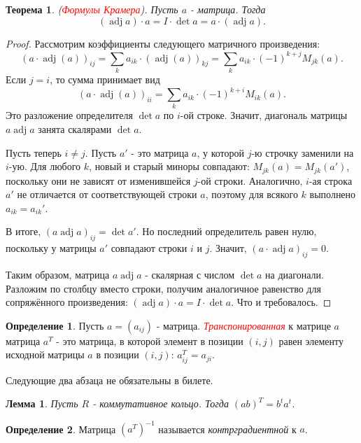 \documentclass[a4paper,100pt]{article}
\theoremstyle{indented}
\newtheorem{theorem}{Теорема}
\newtheorem{lemma}{Лемма}
\theoremstyle{definition}
\newtheorem{defn}{Определение}
\theoremstyle{remark}
\DeclareMathOperator{\adj}{adj}
\begin{document}
\begin{theorem}
    (\hypertarget{n102}{\textcolor{red}{\textit{Формулы Крамера}}}). Пусть $a$ - матрица. Тогда 
    \[
        (\adj a)\cdot a=I\cdot \det a=a\cdot (\adj a).
    \]
\end{theorem}

\begin{proof}
    Рассмотрим коэффициенты следующего матричного произведения: 
    \[
        (a\cdot \adj(a))_{ij}=\sum_k a_{ik}\cdot (\adj (a))_{kj}=\sum_k a_{ik}\cdot (-1)^{k+j}M_{jk}(a).
    \]
    Если $j=i$, то сумма принимает вид
    \[
        (a\cdot\adj(a))_{ii}=\sum_k a_{ik}\cdot(-1)^{k+i}M_{ik}(a).
    \]
    Это разложение определителя $\det a$ по $i$-ой строке. Значит, диагональ матрицы $a \adj a$ занята скалярами $\det a$.\ 

    Пусть теперь $i\neq j$. Пусть $a'$ - это матрица $a$, у которой $j$-ю строчку заменили на $i$-ую. Для любого $k$, новый и старый миноры совпадают: $M_{jk}(a)=M_{jk}(a')$, поскольку они не зависят от изменившейся $j$-ой строки. Аналогично, $i$-ая строка $a'$ не отличается от соответствующей строки $a$, поэтому для всякого $k$ выполнено $a_{ik}=a_{ik}'$.\ 

    В итоге, $(a\adj a)_{ij}=\det a'$. Но последний определитель равен нулю, поскольку у матрицы $a'$ совпадают строки $i$ и $j$. Значит, $(a\cdot \adj a)_{ij}=0$.\ 

    Таким образом, матрица $a\adj a$ - скалярная с числом $\det a$ на диагонали. Разложим по столбцу вместо строки, получим аналогичное равенство для сопряжённого произведения: $(\adj a)\cdot a=I\cdot \det a$. Что и требовалось.
\end{proof}

\begin{defn}
    Пусть $a=(a_{ij})$ - матрица. \hypertarget{n103}{\textcolor{red}{\textit{Транспонированная}}} к матрице $a$ матрица $a^T$ - это матрица, в которой элемент в позиции $(i,j)$ равен элементу исходной матрицы $a$ в позиции $(i, j)$: $a_{ij}^T=a_{ji}$.
\end{defn}

Следующие два абзаца не обязательны в билете.\\

\begin{lemma}
    Пусть $R$ - коммутативное кольцо. Тогда $(ab)^T=b^ta^t$.
\end{lemma}

\begin{defn}
    Матрица $(a^T)^{-1}$ называется \textit{контрградиентной} к $a$.
\end{defn}
\end{document}
